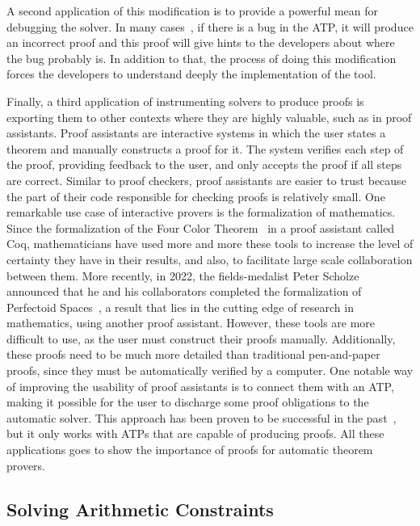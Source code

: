 \documentclass[a4paper, 12pt]{article}
\begin{document}
A second application of this modification is to provide a powerful mean for debugging the solver.
In many cases~\cite{generatingProofs}, if there is a bug in the ATP, it will produce an incorrect
proof and this proof will give hints to the developers about where the bug probably is.
In addition to that, the process of doing this modification forces
the developers to understand deeply the implementation of the tool.

Finally, a third application of instrumenting solvers to produce proofs is exporting them to
other contexts where they are highly valuable, such as in proof assistants.
%
Proof assistants are interactive systems in which the user states a theorem and manually constructs
a proof for it. The system verifies each step of the proof, providing feedback to the user, and only
accepts the proof if all steps are correct.
%
Similar to proof checkers, proof assistants are easier to trust because the part of their code
responsible for checking proofs is relatively small.
%
One remarkable use case of interactive provers is the formalization of mathematics.
Since the formalization of the Four Color Theorem~\cite{fctCoq} in a proof assistant called Coq,
mathematicians have used more and more these tools to increase the level of certainty
they have in their results, and also, to facilitate large scale collaboration between them.
More recently, in 2022, the fields-medalist Peter Scholze announced that he and his collaborators
completed the formalization of Perfectoid Spaces~\cite{scholze}, a result that lies in the
cutting edge of research in mathematics, using another proof assistant.
%
However, these tools are more difficult to use, as the user must construct their proofs
manually. Additionally, these proofs need to be much more detailed than traditional pen-and-paper proofs,
since they must be automatically verified by a computer.
%
One notable way of improving the usability of proof assistants is to connect them with an ATP,
making it possible for the user to discharge some proof obligations to the automatic solver.
This approach has been proven to be successful in the past~\cite{coq2, reconstruct}, but it
only works with ATPs that are capable of producing proofs.
%
All these applications goes to show the importance of proofs for automatic theorem provers.


\subsection{Solving Arithmetic Constraints}
\end{document}
